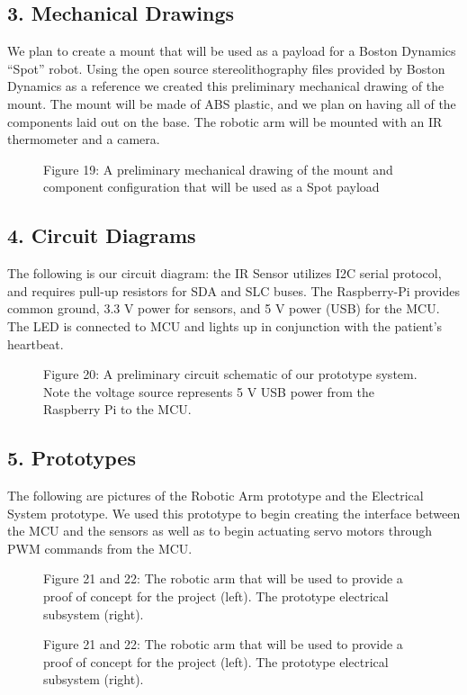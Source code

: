 ﻿\documentclass[10pt]{article}
\begin{document}
\subsection{3. Mechanical Drawings}
We plan to create a mount that will be used as a payload for a Boston Dynamics ``Spot'' robot. Using the open source stereolithography files provided by Boston Dynamics as a reference we created this preliminary mechanical drawing of the mount. The mount will be made of ABS plastic, and we plan on having all of the components laid out on the base. The robotic arm will be mounted with an IR thermometer and a camera.
\begin{figure}
\caption{Figure 19: A preliminary mechanical drawing of the mount and component configuration that will be used as a Spot payload}
\label{fig:19}
\end{figure}
   
\subsection{4. Circuit Diagrams}
The following is our circuit diagram: the IR Sensor utilizes I2C serial protocol, and requires pull-up resistors for SDA and SLC buses. The Raspberry-Pi provides common ground, 3.3 V power for sensors, and 5 V power (USB) for the MCU. The LED is connected to MCU and lights up in conjunction with the patient’s heartbeat. 
\begin{figure}
\caption{Figure 20: A preliminary circuit schematic of our prototype system. Note the voltage source represents 5 V USB power from the Raspberry Pi to the MCU.}
\label{fig:20}
\end{figure}

\subsection{5. Prototypes}
The following are pictures of the Robotic Arm prototype and the Electrical System prototype. We used this prototype to begin creating the interface between the MCU and the sensors as well as to begin actuating servo motors through PWM commands from the MCU.
\begin{figure}
\caption{Figure 21 and 22: The robotic arm that will be used to provide a proof of concept for the project (left). The prototype electrical subsystem (right).}
\label{fig:21}
\end{figure}
\begin{figure}
\caption{Figure 21 and 22: The robotic arm that will be used to provide a proof of concept for the project (left). The prototype electrical subsystem (right).}
\label{fig:22}
\end{figure}
\end{document}
